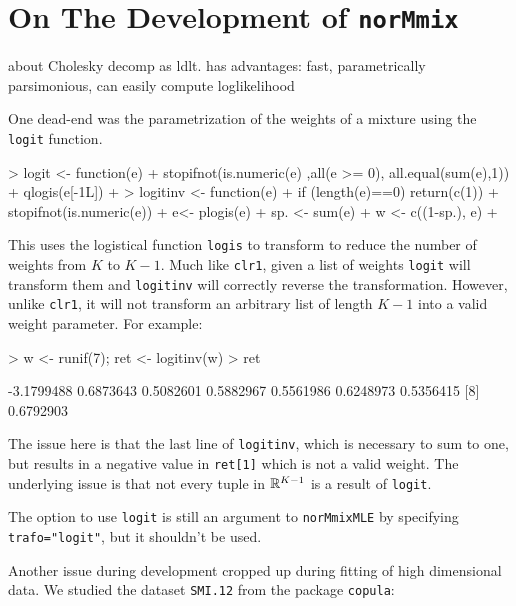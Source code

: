\section{On The Development of {\tt norMmix}}
\label{sec:devel}

about Cholesky decomp as ldlt. has advantages: fast, parametrically 
parsimonious, can easily compute loglikelihood


One dead-end was the parametrization of the weights of a mixture using the 
{\tt logit} function.

\begin{Schunk}
\begin{Sinput}
> logit <- function(e) {
+     stopifnot(is.numeric(e) ,all(e >= 0), all.equal(sum(e),1))
+     qlogis(e[-1L])
+ }
> logitinv <- function(e) {
+     if (length(e)==0) {return(c(1))}
+     stopifnot(is.numeric(e))
+     e<- plogis(e)
+     sp. <- sum(e)
+     w <- c((1-sp.), e)
+ }
\end{Sinput}
\end{Schunk}

This uses the logistical function {\tt logis} to transform to reduce the number
of weights from $K$ to $K-1$. Much like {\tt clr1}, given a list of weights 
{\tt logit} will transform them and {\tt logitinv} will correctly reverse the 
transformation. However, unlike {\tt clr1}, it will not transform an arbitrary 
list of length $K-1$ into a valid weight parameter. For example:

\begin{Schunk}
\begin{Sinput}
> w <- runif(7); ret <- logitinv(w)
> ret
\end{Sinput}
\begin{Soutput}
[1] -3.1799488  0.6873643  0.5082601  0.5882967  0.5561986  0.6248973  0.5356415
[8]  0.6792903
\end{Soutput}
\end{Schunk}

The issue here is that the last line of {\tt logitinv}, which is necessary to 
sum to one, but results in a negative value in {\tt ret[1]} which is not a 
valid weight. The underlying issue is that not every tuple in $\mathbb{R}^{K-1}$ is 
a result of {\tt logit}.

The option to use {\tt logit} is still an argument to {\tt norMmixMLE} by 
specifying {\tt trafo="logit"}, but it shouldn't be used.



Another issue during development cropped up during fitting of high dimensional
data. We studied the dataset {\tt SMI.12} from the package {\tt copula}:

